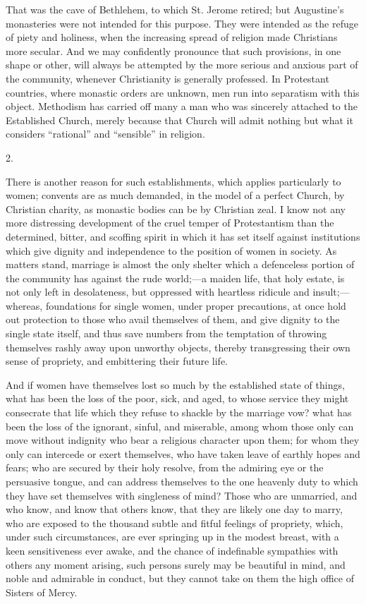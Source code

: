 That was the cave of Bethlehem, to which St. Jerome retired; but
Augustine's monasteries were not intended for this purpose. They were
intended as the refuge of piety and holiness, when the
increasing spread of religion made Christians more secular. And we may
confidently pronounce that such provisions, in one shape or other,
will always be attempted by the more serious and anxious part of the
community, whenever Christianity is generally professed. In Protestant
countries, where monastic orders are unknown, men run into separatism
with this object. Methodism has carried off many a man who was
sincerely attached to the Established Church, merely because that
Church will admit nothing but what it considers ``rational''
and ``sensible'' in religion.

2.

There is another reason for such establishments, which applies
particularly to women; convents are as much demanded, in the model of
a perfect Church, by Christian charity, as monastic bodies can be by
Christian zeal. I know not any more distressing development of the
cruel temper of Protestantism than the determined, bitter, and
scoffing spirit in which it has set itself against institutions which
give dignity and independence to the position of women in society. As
matters stand, marriage is almost the only shelter which a defenceless
portion of the community has against the rude world;—a maiden life,
that holy estate, is not only left in desolateness, but oppressed with
heartless ridicule and insult;—whereas, foundations for single
women, under proper precautions, at once hold out protection to those
who avail themselves of them, and give dignity to the single state
itself, and thus save numbers from the temptation of throwing
themselves rashly away upon unworthy objects, thereby transgressing
their own sense of propriety, and embittering their future life.

And if women have themselves lost so much by the established
state of things, what has been the loss of the poor, sick, and aged,
to whose service they might consecrate that life which they refuse to
shackle by the marriage vow? what has been the loss of the ignorant,
sinful, and miserable, among whom those only can move without
indignity who bear a religious character upon them; for whom they only
can intercede or exert themselves, who have taken leave of earthly
hopes and fears; who are secured by their holy resolve, from the
admiring eye or the persuasive tongue, and can address themselves to
the one heavenly duty to which they have set themselves with
singleness of mind? Those who are unmarried, and who know, and know
that others know, that they are likely one day to marry, who are
exposed to the thousand subtle and fitful feelings of propriety,
which, under such circumstances, are ever springing up in the modest
breast, with a keen sensitiveness ever awake, and the chance of
indefinable sympathies with others any moment arising, such persons
surely may be beautiful in mind, and noble and admirable in conduct,
but they cannot take on them the high office of Sisters of Mercy.

